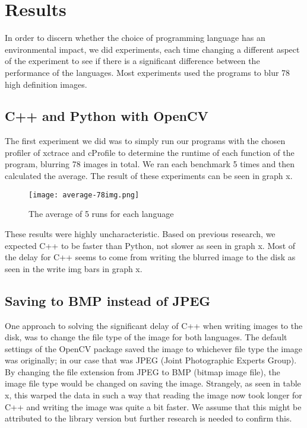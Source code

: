 \chapter{Results}
In order to discern whether the choice of programming language has an environmental impact, we did experiments, each time changing a different aspect of the experiment to see if there is a significant difference between the performance of the languages. Most experiments used the programs to blur 78 high definition images.

\section{C++ and Python with OpenCV }
The first experiment we did was to simply run our programs with the chosen profiler of xctrace and cProfile to determine the runtime of each function of the program, blurring 78 images in total. We ran each benchmark 5 times and then calculated the average. The result of these experiments can be seen in graph x.

\begin{figure}[H]
	\centering
	\texttt{[image: average-78img.png]}
	\caption{The average of 5 runs for each language}
	\label{figure:average-78img}
\end{figure}

These results were highly uncharacteristic. Based on previous research, we expected C++ to be faster than Python, not slower as seen in graph x. Most of the delay for C++ seems to come from writing the blurred image to the disk as seen in the write img bars in graph x.

\section{Saving to BMP instead of JPEG}
One approach to solving the significant delay of C++ when writing images to the disk, was to change the file type of the image for both languages. The default settings of the OpenCV package saved the image to whichever file type the image was originally; in our case that was JPEG (Joint Photographic Experts Group). By changing the file extension from JPEG to BMP (bitmap image file), the image file type would be changed on saving the image. Strangely, as seen in table x, this warped the data in such a way that reading the image now took longer for C++ and writing the image was quite a bit faster. We assume that this might be attributed to the library version but further research is needed to confirm this.


